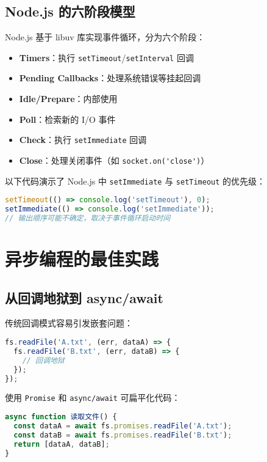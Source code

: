\section{Node.js 的六阶段模型}
Node.js 基于 libuv 库实现事件循环，分为六个阶段：\par
\begin{itemize}
\item \textbf{Timers}：执行 \verb!setTimeout!/\verb!setInterval! 回调
\item \textbf{Pending Callbacks}：处理系统错误等挂起回调
\item \textbf{Idle/Prepare}：内部使用
\item \textbf{Poll}：检索新的 I/O 事件
\item \textbf{Check}：执行 \verb!setImmediate! 回调
\item \textbf{Close}：处理关闭事件（如 \verb!socket.on('close')!）
\end{itemize}
以下代码演示了 Node.js 中 \verb!setImmediate! 与 \verb!setTimeout! 的优先级：\par
\begin{lstlisting}[language=javascript]
setTimeout(() => console.log('setTimeout'), 0);
setImmediate(() => console.log('setImmediate'));
// 输出顺序可能不确定，取决于事件循环启动时间
\end{lstlisting}
\chapter{异步编程的最佳实践}
\section{从回调地狱到 async/await}
传统回调模式容易引发嵌套问题：\par
\begin{lstlisting}[language=javascript]
fs.readFile('A.txt', (err, dataA) => {
  fs.readFile('B.txt', (err, dataB) => {
    // 回调地狱
  });
});
\end{lstlisting}
使用 \verb!Promise! 和 \verb!async/await! 可扁平化代码：\par
\begin{lstlisting}[language=javascript]
async function 读取文件() {
  const dataA = await fs.promises.readFile('A.txt');
  const dataB = await fs.promises.readFile('B.txt');
  return [dataA, dataB];
}
\end{lstlisting}
